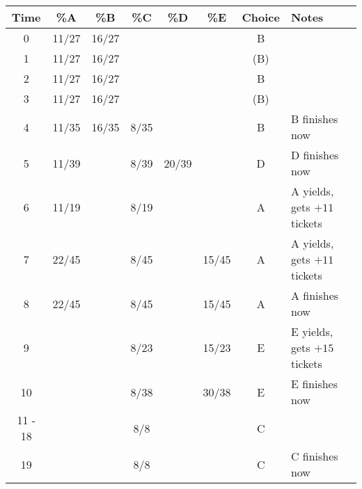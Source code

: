 \documentclass[11pt]{article} %
\begin{document}
\begin{center}
  {
  \begin{tabular}{|c|c|c|c|c|c|c|p{5cm}|}
    \hline
    \textbf{Time} & \textbf{\%A} & \textbf{\%B} & \textbf{\%C} & \textbf{\%D} &
    \textbf{\%E} & \textbf{Choice} & \textbf{Notes}\\
    \hline
    0 & 11/27 & 16/27 & & & & B & \\
    1 & 11/27 & 16/27 & & & & (B) & \\
    2 & 11/27 & 16/27 & & & & B & \\
    3 & 11/27 & 16/27 & & & & (B) & \\
    4 & 11/35 & 16/35 & 8/35 & & & B & B finishes now\\
    5 & 11/39 & & 8/39 & 20/39 & & D & D finishes now\\
    6 & 11/19 & & 8/19 & & & A & A yields, gets $+11$ tickets\\
    7 & 22/45 & & 8/45 & & 15/45 & A & A yields, gets $+11$ tickets\\
    8 & 22/45 & & 8/45 & & 15/45 & A & A finishes now\\
    9 & & & 8/23 & & 15/23 & E & E yields, gets $+15$ tickets\\
    10 & & & 8/38 & & 30/38 & E & E finishes now\\
    11 - 18 & & & 8/8 & & & C & \\
    19 & & & 8/8 & & & C & C finishes now\\
    \hline
  \end{tabular}
  }
\end{center}
\end{document}
